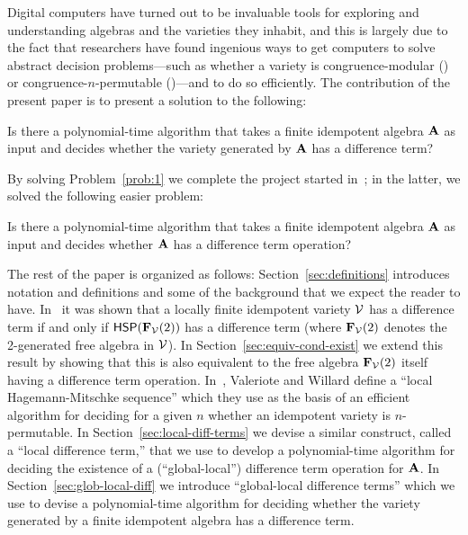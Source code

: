 Digital computers have turned out to be invaluable tools for exploring and
understanding algebras and the varieties they inhabit, and this is largely due
to the fact that researchers have found ingenious ways
to get computers to solve abstract decision problems---such as
whether a variety is 
congruence-modular (\cite{Freese:2009}) or
congruence-$n$-permutable (\cite{MR3239624})---and to do so efficiently.
The contribution of the present paper is to present a solution to the following:
\begin{prob}
  \label{prob:1}
  Is there a polynomial-time algorithm that takes a finite
  idempotent algebra $\mathbf{A}$ as input and decides whether the variety generated by
  $\mathbf{A}$ has a difference term?
\end{prob}
By solving Problem~\ref{prob:1} we complete the project started
in~\cite{DeMeo:2017}; in the latter, we solved the following easier problem:
\begin{prob}
  \label{prob:2}
  Is there a polynomial-time algorithm that takes a finite
  idempotent algebra $\mathbf{A}$ as input and decides whether 
  $\mathbf{A}$ has a difference term operation?
\end{prob}

The rest of the paper is organized as follows:
Section~\ref{sec:definitions} introduces notation and definitions and some of
the background that we expect the reader to have.
In~\cite{MR1358491} 
it was shown that a locally finite idempotent variety $\mathcal{V}$ has a difference
term if and only if $\mathsf{H} \mathsf{S} \mathsf{P}(\mathbf{F}_{\mathcal{V}}(2))$ 
has a difference term (where $\mathbf{F}_{\mathcal{V}}(2)$ denotes the 2-generated free algebra in $\mathcal{V}$).
In Section~\ref{sec:equiv-cond-exist}
we extend this result by showing that this is also equivalent to
the free algebra $\mathbf{F}_{\mathcal{V}}(2)$ itself having a difference term operation.
In~\cite{MR3239624},
Valeriote and Willard define 
a ``local Hagemann-Mitschke sequence'' which they use as the basis of
an efficient algorithm for deciding for a given $n$ whether an idempotent
variety is $n$-permutable. 
In Section~\ref{sec:local-diff-terms}
we devise a similar construct, called
a ``local difference term,'' that we use to develop a polynomial-time
algorithm for deciding the existence of a (``global-local'') difference term
operation for $\mathbf{A}$.  In Section~\ref{sec:glob-local-diff} we introduce 
``global-local difference terms'' which we use to
devise a polynomial-time algorithm for deciding whether the variety
generated by a finite idempotent algebra has a difference term.


